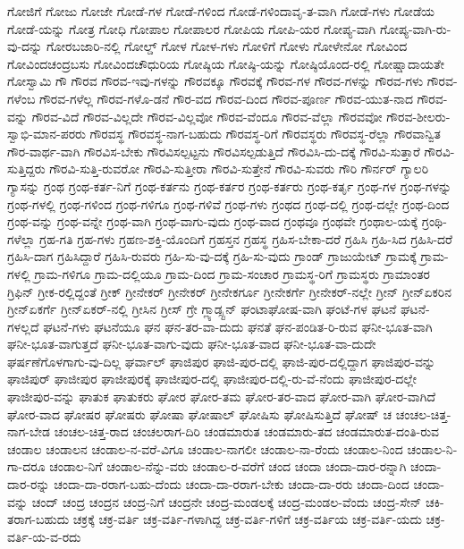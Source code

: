 {ಗೋಜಿಗೆ
ಗೋಜು
ಗೋಜೇ
ಗೋಡೆ-ಗಳ
ಗೋಡೆ-ಗಳಿಂದ
ಗೋಡೆ-ಗಳಿಂದಾವೃ-ತ-ವಾಗಿ
ಗೋಡೆ-ಗಳು
ಗೋಡೆಯ
ಗೋಡೆ-ಯನ್ನು
ಗೋತ್ರ
ಗೋಧಿ
ಗೋಪಾಲ
ಗೋಪಾಲರ
ಗೋಪಿಯ
ಗೋಪಿ-ಯರ
ಗೋಪ್ಯ-ವಾಗಿ
ಗೋಪ್ಯ-ವಾಗಿ-ರು-ವು-ದನ್ನು
ಗೋರಬಜಾರಿ-ನಲ್ಲಿ
ಗೋಲ್ಡ್
ಗೋಳ
ಗೋಳ-ಗಳು
ಗೋಳಿಗೆ
ಗೋಳು
ಗೋಳೇನೋ
ಗೋವಿಂದ
ಗೋವಿಂದಚಂದ್ರಬಸು
ಗೋವಿಂದಚೌಧುರಿಯ
ಗೋಷ್ಠಿಯ
ಗೋಷ್ಠಿ-ಯನ್ನು
ಗೋಷ್ಠಿಯೊಂದ-ರಲ್ಲಿ
ಗೋಷ್ಷಾದಾಯತೇ
ಗೋಸ್ವಾಮಿ
ಗೌ
ಗೌರವ
ಗೌರವ-ಇವು-ಗಳನ್ನು
ಗೌರವಕ್ಕೂ
ಗೌರವಕ್ಕೆ
ಗೌರವ-ಗಳ
ಗೌರವ-ಗಳನ್ನು
ಗೌರವ-ಗಳು
ಗೌರವ-ಗಳೆಂಬ
ಗೌರವ-ಗಳೆಲ್ಲ
ಗೌರವ-ಗಳೊ-ಡನೆ
ಗೌರ-ವದ
ಗೌರವ-ದಿಂದ
ಗೌರವ-ಪೂರ್ಣ
ಗೌರವ-ಯುತ-ನಾದ
ಗೌರವ-ವನ್ನು
ಗೌರವ-ವಿದೆ
ಗೌರವ-ವಿಲ್ಲದೇ
ಗೌರವ-ವಿಲ್ಲವೋ
ಗೌರವ-ವೆಂದೂ
ಗೌರವ-ವೆಲ್ಲಾ
ಗೌರವವೋ
ಗೌರವ-ಶೀಲರು-ಸ್ವಾಭಿ-ಮಾನ-ಪರರು
ಗೌರವಸ್ಥ
ಗೌರವಸ್ಥ-ನಾಗ-ಬಹುದು
ಗೌರವಸ್ಥ-ರಿಗೆ
ಗೌರವಸ್ಥರು
ಗೌರವಸ್ಥ-ರೆಲ್ಲಾ
ಗೌರವಾನ್ವಿತ
ಗೌರ-ವಾರ್ಥ-ವಾಗಿ
ಗೌರವಿಸ-ಬೇಕು
ಗೌರವಿಸಲ್ಪಟ್ಟನು
ಗೌರವಿಸಲ್ಪಡುತ್ತಿದೆ
ಗೌರವಿಸಿ-ದು-ದಕ್ಕೆ
ಗೌರವಿ-ಸುತ್ತಾರೆ
ಗೌರವಿ-ಸುತ್ತಿದ್ದರು
ಗೌರವಿ-ಸುತ್ತಿ-ರುವರೋ
ಗೌರವಿ-ಸುತ್ತೀರಾ
ಗೌರವಿ-ಸುತ್ತೇನೆ
ಗೌರವಿ-ಸುವರು
ಗೌರಿ
ಗೌರ್ನರ್
ಗ್ಯಾಲರಿ
ಗ್ಯಾಸನ್ನು
ಗ್ರಂಥ
ಗ್ರಂಥ-ಕರ್ತ-ನಿಗೆ
ಗ್ರಂಥ-ಕರ್ತನು
ಗ್ರಂಥ-ಕರ್ತರ
ಗ್ರಂಥ-ಕರ್ತರು
ಗ್ರಂಥ-ಕರ್ತೃ
ಗ್ರಂಥ-ಗಳ
ಗ್ರಂಥ-ಗಳನ್ನು
ಗ್ರಂಥ-ಗಳಲ್ಲಿ
ಗ್ರಂಥ-ಗಳಿಂದ
ಗ್ರಂಥ-ಗಳಿಗೂ
ಗ್ರಂಥ-ಗಳಿವೆ
ಗ್ರಂಥ-ಗಳು
ಗ್ರಂಥದ
ಗ್ರಂಥ-ದಲ್ಲಿ
ಗ್ರಂಥ-ದಲ್ಲೇ
ಗ್ರಂಥ-ದಿಂದ
ಗ್ರಂಥ-ವನ್ನು
ಗ್ರಂಥ-ವನ್ನೇ
ಗ್ರಂಥ-ವಾಗಿ
ಗ್ರಂಥ-ವಾಗು-ವುದು
ಗ್ರಂಥ-ವಾದ
ಗ್ರಂಥವೂ
ಗ್ರಂಥವೇ
ಗ್ರಂಥಾಲ-ಯಕ್ಕೆ
ಗ್ರಂಥಿ-ಗಳೆಲ್ಲಾ
ಗ್ರಹ-ಗತಿ
ಗ್ರಹ-ಗಳು
ಗ್ರಹಣ-ಶಕ್ತಿ-ಯೊಂದಿಗೆ
ಗ್ರಹಸ್ತನ
ಗ್ರಹಸ್ಥ
ಗ್ರಹಿಸ-ಬೇಕಾ-ದರೆ
ಗ್ರಹಿಸಿ
ಗ್ರಹಿ-ಸಿದ
ಗ್ರಹಿಸಿ-ದರೆ
ಗ್ರಹಿಸಿ-ದಾಗ
ಗ್ರಹಿಸಿದ್ದಾರೆ
ಗ್ರಹಿಸಿ-ರುವರು
ಗ್ರಹಿ-ಸು-ವು-ದಕ್ಕೆ
ಗ್ರಹಿ-ಸು-ವುದು
ಗ್ರಾಂಡ್
ಗ್ರಾಜುಯೇಟ್
ಗ್ರಾಮಕ್ಕೆ
ಗ್ರಾಮ-ಗಳಲ್ಲಿ
ಗ್ರಾಮ-ಗಳಿಗೂ
ಗ್ರಾಮ-ದಲ್ಲಿಯೂ
ಗ್ರಾಮ-ದಿಂದ
ಗ್ರಾಮ-ಸಂಚಾರ
ಗ್ರಾಮಸ್ಥ-ರಿಗೆ
ಗ್ರಾಮಸ್ಥರು
ಗ್ರಾಮಾಂತರ
ಗ್ರಿಫಿನ್
ಗ್ರೀಕ-ರಲ್ಲಿದ್ದಂತೆ
ಗ್ರೀಕ್
ಗ್ರೀನೇಕರ್
ಗ್ರೀನೇಕರ್
ಗ್ರೀನೇಕರ್ಗೂ
ಗ್ರೀನೇಕರ್ಗೆ
ಗ್ರೀನೇಕರ್-ನಲ್ಲೇ
ಗ್ರೀನ್
ಗ್ರೀನ್ಏಕರಿನ
ಗ್ರೀನ್ಏಕರ್ಗೆ
ಗ್ರೀನ್ಏಕರ್-ನಲ್ಲಿ
ಗ್ರೀಸಿನ
ಗ್ರೀಸ್
ಗ್ರೇ
ಗ್ಲ್ಯಾಡ್ಸ್ಟನ್
ಘಂಟಾಘೋಷ-ವಾಗಿ
ಘಂಟೆ-ಗಳ
ಘಟನೆ
ಘಟನೆ-ಗಳಲ್ಲದೆ
ಘಟನೆ-ಗಳು
ಘಟನೆಯೂ
ಘನ
ಘನ-ತರ-ವಾ-ದುದು
ಘನತೆ
ಘನ-ಪಂಡಿತ-ರಿ-ರುವ
ಘನೀ-ಭೂತ-ವಾಗಿ
ಘನೀ-ಭೂತ-ವಾಗುತ್ತದೆ
ಘನೀ-ಭೂತ-ವಾಗು-ವುದು
ಘನೀ-ಭೂತ-ವಾದ
ಘನೀ-ಭೂತ-ವಾ-ದುದೇ
ಘರ್ಷಣೆಗೊಳಗಾಗು-ವು-ದಿಲ್ಲ
ಘರ್ವಾಲ್
ಘಾಜಿಪುರ
ಘಾಜಿ-ಪುರ-ದಲ್ಲಿ
ಘಾಜಿ-ಪುರ-ದಲ್ಲಿದ್ದಾಗ
ಘಾಜಿಪುರ-ವನ್ನು
ಘಾಜಿಪುರ್
ಘಾಜೀಪುರ
ಘಾಜೀಪುರಕ್ಕೆ
ಘಾಜೀಪುರ-ದಲ್ಲಿ
ಘಾಜೀಪುರ-ದಲ್ಲಿ-ರು-ವೆ-ನೆಂದು
ಘಾಜೀಪುರ-ದಲ್ಲೇ
ಘಾಜೀಪುರ-ವನ್ನು
ಘಾತುಕ
ಘಾತುಕರು
ಘೋರ
ಘೋರ-ತಮ
ಘೋರ-ತರ-ವಾದ
ಘೋರ-ವಾಗಿ
ಘೋರ-ವಾಗಿದೆ
ಘೋರ-ವಾದ
ಘೋಷರ
ಘೋಷರು
ಘೋಷಾ
ಘೋಷಾಲ್
ಘೋಷಿಸು
ಘೋಷಿಸುತ್ತಿದೆ
ಘೋಷ್
ಚ
ಚಂಚಲ-ಚಿತ್ತ-ನಾಗ-ಬೇಡ
ಚಂಚಲ-ಚಿತ್ತ-ರಾದ
ಚಂಚಲರಾಗ-ದಿರಿ
ಚಂಡಮಾರುತ
ಚಂಡಮಾರು-ತದ
ಚಂಡಮಾರುತ-ದಂತಿ-ರುವ
ಚಂಡಾಲ
ಚಂಡಾಲನ
ಚಂಡಾಲ-ನ-ವರೆ-ವಿಗೂ
ಚಂಡಾಲ-ನಾಗಲೀ
ಚಂಡಾಲ-ನಾ-ರೆಂದು
ಚಂಡಾಲ-ನಿಂದ
ಚಂಡಾಲ-ನಿ-ಗಾ-ದರೂ
ಚಂಡಾಲ-ನಿಗೆ
ಚಂಡಾಲ-ನೆನ್ನು-ವರು
ಚಂಡಾಲ-ರ-ವರೆಗೆ
ಚಂದ
ಚಂದಾ
ಚಂದಾ-ದಾರ-ರನ್ನಾಗಿ
ಚಂದಾ-ದಾರ-ರನ್ನು
ಚಂದಾ-ದಾ-ರರಾಗ-ಬಹು-ದೆಂದು
ಚಂದಾ-ದಾ-ರರಾಗ-ಬೇಕು
ಚಂದಾ-ದಾ-ರರು
ಚಂದಾ-ದಿಂದ
ಚಂದಾ-ವನ್ನು
ಚಂದ್
ಚಂದ್ರ
ಚಂದ್ರನ
ಚಂದ್ರ-ನಿಗೆ
ಚಂದ್ರನೇ
ಚಂದ್ರ-ಮಂಡಲಕ್ಕೆ
ಚಂದ್ರ-ಮಂಡಲ-ವೆಂದು
ಚಂದ್ರ-ಸೇನ್
ಚಕಿ-ತರಾಗ-ಬಹುದು
ಚಕ್ರಕ್ಕೆ
ಚಕ್ರ-ವರ್ತಿ
ಚಕ್ರ-ವರ್ತಿ-ಗಳಾಗಿದ್ದ
ಚಕ್ರ-ವರ್ತಿ-ಗಳಿಗೆ
ಚಕ್ರ-ವರ್ತಿಯ
ಚಕ್ರ-ವರ್ತಿ-ಯದು
ಚಕ್ರ-ವರ್ತಿ-ಯ-ವ-ರದು
}
